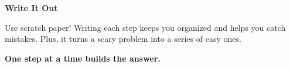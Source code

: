 {\vspace{3mm}

\begin{tcolorbox}[
    enhanced,
    colback=funYellowLight,
    colframe=funYellow!60,
    arc=10pt,
    boxrule=1pt,
    left=6mm, right=6mm, top=4mm, bottom=4mm,
]
{\bfseries\color{funYellowDark} \faLightbulb\hspace{2mm}Write It Out}

\vspace{2mm}

Use scratch paper! Writing each step keeps you organized and helps you catch mistakes. Plus, it turns a scary problem into a series of easy ones.
\end{tcolorbox}

\vspace{4mm}

\begin{center}
{\large\bfseries\color{funPinkDark} \faCube\hspace{2mm}One step at a time builds the answer.\hspace{2mm}\faCube}
\end{center}

}
\newpage
